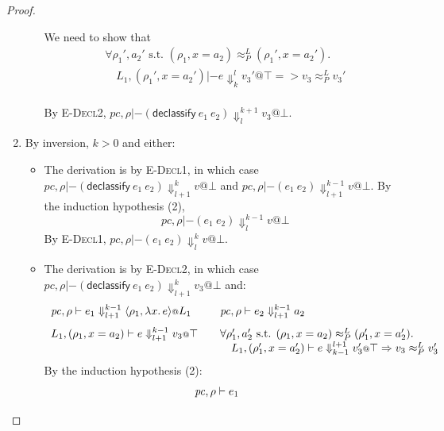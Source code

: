 \documentclass{article}
\makeatletter
\theoremstyle{definition}
\newcommand{\at}{\ensuremath{{\scriptstyle{@}}}}
\newcommand{\pc}{\ensuremath{{\mathit{pc}}}}
\makeatother
\begin{document}
\begin{proof}
\begin{enumerate}
\begin{itemize}
\[        \]
        We need to show that
        \[
        {\begin{array}{l}
            \forall{\rho_1', a_2' \text{ s.t. }
              (\rho_1, x = a_2) \approx^{L}_{P} (\rho_1', x = a_2')}.
            \\\quad
            L_1, (\rho_1', x = a_2') |- e \Downarrow^{l}_{k} v_3' \at \top =>
            v_3 \approx^{L}_{P} v_3'
          \end{array}}
        \]
        \\[90ex]
        By \textsc{E-Decl2},
        $\pc, \rho |- (\mathsf{declassify}\ e_1\ e_2)
        \Downarrow^{k+1}_{l}
        v_3 \at \bot$.
      \end{itemize}
      \pagebreak
    \item By inversion, $k > 0$ and either:
      \begin{itemize}
      \item The derivation is by \textsc{E-Decl1},
        in which case
        $\pc, \rho |- (\mathsf{declassify}\ e_1\ e_2)
        \Downarrow^{k}_{l+1}
        v \at \bot$ and
        $\pc, \rho |- (e_1\ e_2) \Downarrow^{k-1}_{l+1} v \at \bot$.
        By the induction hypothesis (2),
        \[
        \pc, \rho |- (e_1\ e_2) \Downarrow^{k-1}_{l} v \at \bot
        \]
        By \textsc{E-Decl1},
        $\pc, \rho |- (e_1\ e_2) \Downarrow^{k}_{l} v \at \bot$.
      \item The derivation is by \textsc{E-Decl2}, %
        in which case
        $\pc, \rho |- (\mathsf{declassify}\ e_1\ e_2)
        \Downarrow^{k}_{l+1}
        v_3 \at \bot$ and:
      \[
      {\begin{array}{l@{\qquad}l}
          \pc, \rho |- e_1
          \Downarrow^{k-1}_{l+1}
          \langle{\rho_1, \lambda{x}.\, e\rangle} \at L_1
          &
          \pc, \rho |- e_2
          \Downarrow^{k-1}_{l+1}
          a_2
          \\[1.8ex]
          L_1, (\rho_1, x = a_2) |- e
          \Downarrow^{k-1}_{l+1}
          v_3 \at \top
          &
          \forall{\rho_1', a_2' \text{ s.t. }
            (\rho_1, x = a_2) \approx^{L}_{P} (\rho_1', x = a_2')}.
          \\ & \quad
          L_1, (\rho_1', x = a_2') |- e \Downarrow^{l+1}_{k-1} v_3' \at \top =>
          v_3 \approx^{L}_{P} v_3'
        \end{array}}
      \]
      By the induction hypothesis (2):
      \[
      {\begin{array}{l@{\qquad}l@{\qquad}l}
          \pc, \rho |- e_1

\end{array}}\]
\end{itemize}
\end{enumerate}
\end{proof}
\end{document}

